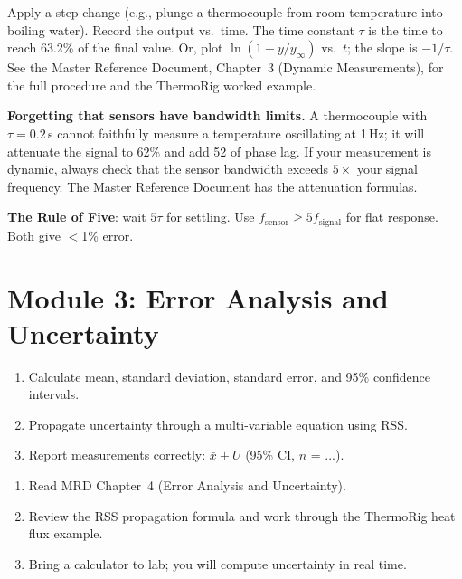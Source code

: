 \documentclass[11pt,letterpaper]{article}
\begin{document}
\begin{faqbox}
Apply a step change (e.g., plunge a thermocouple from room temperature into boiling water). Record the output vs.\ time. The time constant $\tau$ is the time to reach 63.2\% of the final value. Or, plot $\ln(1 - y/y_\infty)$ vs.\ $t$; the slope is $-1/\tau$. See the Master Reference Document, Chapter~3 (Dynamic Measurements), for the full procedure and the ThermoRig worked example.
\end{faqbox}

\begin{warnbox}
\textbf{Forgetting that sensors have bandwidth limits.} A thermocouple with $\tau = 0.2$\,s cannot faithfully measure a temperature oscillating at 1\,Hz; it will attenuate the signal to 62\% and add 52\textdegree{} of phase lag. If your measurement is dynamic, always check that the sensor bandwidth exceeds $5\times$ your signal frequency. The Master Reference Document has the attenuation formulas.
\end{warnbox}

\begin{tipbox}
\textbf{The Rule of Five}: wait $5\tau$ for settling. Use $f_{\text{sensor}} \geq 5 f_{\text{signal}}$ for flat response. Both give $<$1\% error.
\end{tipbox}

\section{Module 3: Error Analysis and Uncertainty}

\begin{priorities}
\begin{enumerate}[leftmargin=*, itemsep=1pt, topsep=0pt]
    \item Calculate mean, standard deviation, standard error, and 95\% confidence intervals.
    \item Propagate uncertainty through a multi-variable equation using RSS.
    \item Report measurements correctly: $\bar{x} \pm U$ (95\% CI, $n$ = ...).
\end{enumerate}
\end{priorities}

\begin{tcolorbox}[colback=minesblue!3, colframe=minesblue!40, boxrule=0.5pt, arc=2pt, left=6pt, right=6pt, top=3pt, bottom=3pt, fonttitle=\small\bfseries\color{minesblue}, title={Before You Start: Module 3}]
\small
\begin{enumerate}[nosep,leftmargin=*]
\item Read MRD Chapter~4 (Error Analysis and Uncertainty).
\item Review the RSS propagation formula and work through the ThermoRig heat flux example.
\item Bring a calculator to lab; you will compute uncertainty in real time.
\end{enumerate}
\end{tcolorbox}
\end{document}
